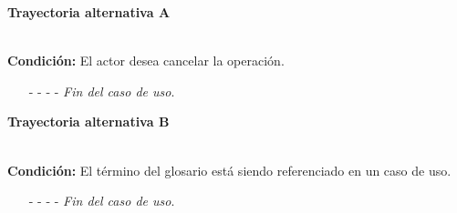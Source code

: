 

\hypertarget{CU6-3:TAA}{\textbf{Trayectoria alternativa A}}\\
\noindent \textbf{Condición:} El actor desea cancelar la operación.
\begin{enumerate}
	\UCpaso[\UCactor] Oprime el botón  de la pantalla emergente.
	\UCpaso[\UCsist] Muestra la pantalla .
	\item[- -] - - {\em {Fin del caso de uso}}.%
\end{enumerate}	
\hypertarget{CU6-3:TAB}{\textbf{Trayectoria alternativa B}}\\
\noindent \textbf{Condición:} El término del glosario está siendo referenciado en un caso de uso.
\begin{enumerate}
	\UCpaso[\UCsist] Muestra el mensaje  en la pantalla .
	\item[- -] - - {\em {Fin del caso de uso}}.
\end{enumerate}

